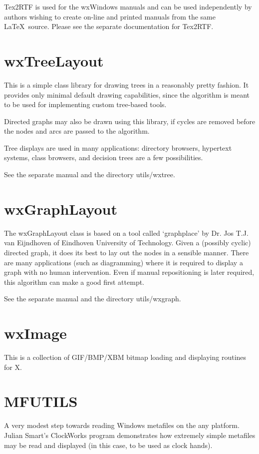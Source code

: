Tex2RTF is used for the wxWindows manuals and can be used independently
by authors wishing to create on-line and printed manuals from the same\rtfsp
\LaTeX\ source.  Please see the separate documentation for Tex2RTF.

\section{wxTreeLayout}

This is a simple class library for drawing trees in a reasonably pretty
fashion. It provides only minimal default drawing capabilities, since
the algorithm is meant to be used for implementing custom tree-based
tools.

Directed graphs may also be drawn using this library, if cycles are
removed before the nodes and arcs are passed to the algorithm.

Tree displays are used in many applications: directory browsers,
hypertext systems, class browsers, and decision trees are a few
possibilities.

See the separate manual and the directory utils/wxtree.

\section{wxGraphLayout}

The wxGraphLayout class is based on a tool called `graphplace' by Dr.
Jos T.J. van Eijndhoven of Eindhoven University of Technology. Given a
(possibly cyclic) directed graph, it does its best to lay out the nodes
in a sensible manner. There are many applications (such as diagramming)
where it is required to display a graph with no human intervention. Even
if manual repositioning is later required, this algorithm can make a good
first attempt.

See the separate manual and the directory utils/wxgraph. 

\section{wxImage}\label{wximage}

This is a collection of GIF/BMP/XBM bitmap loading and displaying
routines for X.

\section{MFUTILS}\label{mfutils}

A very modest step towards reading Windows metafiles on the
any platform. Julian Smart's ClockWorks program demonstrates
how extremely simple metafiles may be read and displayed (in this
case, to be used as clock hands).

